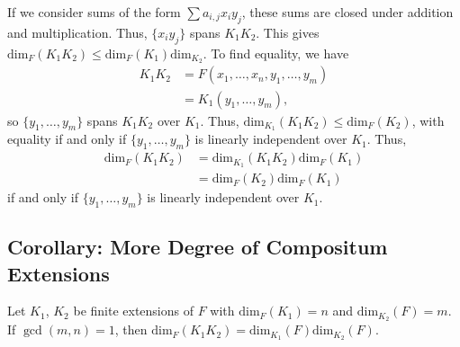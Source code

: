 \documentclass[10pt]{extarticle}
\begin{document}
  If we consider sums of the form $\sum a_{i,j}x_iy_j$, these sums are closed under addition and multiplication. Thus, $\{x_iy_j\}$ spans $K_1K_2$. This gives $\text{dim}_{F}(K_1K_2) \leq \text{dim}_F(K_1)\text{dim}_{K_2}$. To find equality, we have
  \begin{align*}
    K_1K_2 &= F(x_1,\dots,x_n,y_1,\dots,y_m)\\
           &= K_1(y_1,\dots,y_m),
  \end{align*}
  so $\{y_1,\dots,y_m\}$ spans $K_1K_2$ over $K_1$. Thus, $\text{dim}_{K_1}(K_1K_2) \leq \text{dim}_{F}(K_2)$, with equality if and only if $\{y_1,\dots,y_m\}$ is linearly independent over $K_1$. Thus,
  \begin{align*}
    \text{dim}_{F}(K_1K_2) &= \text{dim}_{K_1}(K_1K_2)\text{dim}_{F}(K_1)\\
                           &= \text{dim}_{F}(K_2)\text{dim}_{F}(K_1)
  \end{align*}
  if and only if $\{y_1,\dots,y_m\}$ is linearly independent over $K_1$.
  \begin{center}
  \end{center}
  \subsection{Corollary: More Degree of Compositum Extensions}%
  Let $K_1$, $K_2$ be finite extensions of $F$ with $\text{dim}_{F}(K_1) = n$ and $\text{dim}_{K_2}(F) = m$. If $\gcd(m,n) = 1$, then $\text{dim}_{F}(K_1K_2) = \text{dim}_{K_1}(F)\text{dim}_{K_2}(F)$.\\
\end{document}
